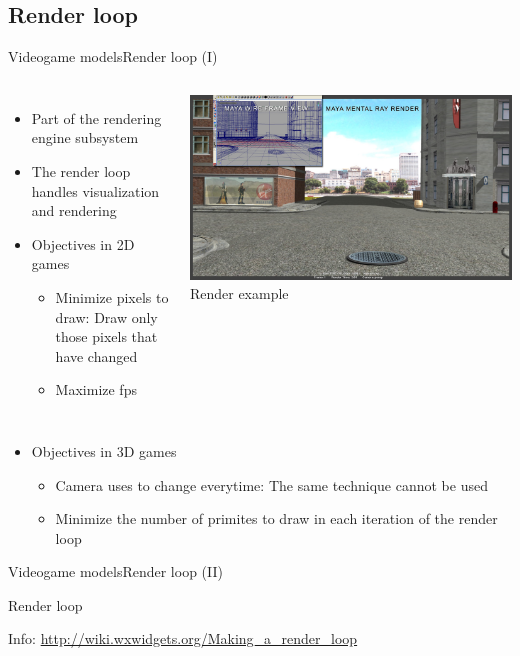 \documentclass[10pt,compress]{beamer} %
\begin{document}
\subsection{Render loop}
\begin{frame}{Videogame models}{Render loop (I)}
    \begin{columns}
		\begin{itemize}
		\item Part of the rendering engine subsystem
	   	\item The render loop handles visualization and rendering
	   	\item Objectives in 2D games
		\begin{itemize}
			\item Minimize pixels to draw: Draw only those pixels that have changed
			\item Maximize fps
		\end{itemize}
		\end{itemize}
	\centering\includegraphics[width=0.8\linewidth]{figs/rendering}\\
	Render example
 	\end{columns}
	\begin{itemize}
	\item Objectives in 3D games
		\begin{itemize}
			\item Camera uses to change everytime: The same technique cannot be used
			\item Minimize the number of primites to draw in each iteration of the render loop
		\end{itemize}
	\end{itemize}
\end{frame}

\begin{frame}{Videogame models}{Render loop (II)}
	    \vspace{-0.2cm}
    \begin{block}{Render loop}
	    \vspace{-0.2cm}
	    
		\vspace{-0.2cm}
	\end{block}
	Info: \url{http://wiki.wxwidgets.org/Making\_a\_render\_loop}
\end{frame}
\end{document}
